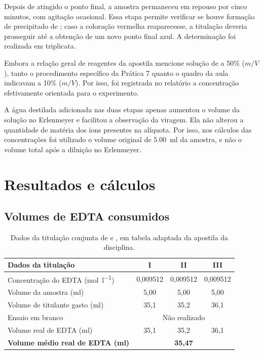 \documentclass[a4paper,12pt]{article}
\newcommand{\VolAmostra}{5.00}
\begin{document}
Depois de atingido o ponto final, a amostra permaneceu em repouso por cinco
minutos, com agitação ocasional. Essa etapa permite verificar se houve
formação de precipitado de ; caso a coloração vermelha
reaparecesse, a titulação deveria prosseguir até a obtenção de um novo ponto
final azul. A determinação foi realizada em triplicata.

Embora a relação geral de reagentes da apostila mencione solução de
 a 50\% ($m/V$), tanto o procedimento específico da Prática 7
quanto o quadro da aula indicavam  a 10\% ($m/V$). Por isso, foi
registrada no relatório a concentração efetivamente orientada para o
experimento.

A água destilada adicionada nas duas etapas apenas aumentou o volume da
solução no Erlenmeyer e facilitou a observação da viragem. Ela não alterou
a quantidade de matéria dos íons presentes na alíquota. Por isso, nos
cálculos das concentrações foi utilizado o volume original de
\qty{\VolAmostra}{\milli\litre} da amostra, e não o volume total após a
diluição no Erlenmeyer.

\section{Resultados e cálculos}

\subsection{Volumes de EDTA consumidos}

\begin{table}[H]
\centering
\caption{Dados da titulação conjunta de  e , em tabela
adaptada da apostila da disciplina.}
\label{tab:dados_total}
\begin{tabular}{lccc}
\toprule
\textbf{Dados da titulação} & \textbf{I} & \textbf{II} & \textbf{III}\\
\midrule
Concentração do EDTA (\si{\mole\per\litre})
  & 0,009512 & 0,009512 & 0,009512\\
Volume da amostra (\si{\milli\litre})
  & 5,00 & 5,00 & 5,00\\
Volume de titulante gasto (\si{\milli\litre})
  & 35,1 & 35,2 & 36,1\\
Ensaio em branco
  & \multicolumn{3}{c}{Não realizado}\\
Volume real de EDTA (\si{\milli\litre})
  & 35,1 & 35,2 & 36,1\\
\textbf{Volume médio real de EDTA (\si{\milli\litre})}
  & \multicolumn{3}{c}{\textbf{35,47}}\\
\bottomrule
\end{tabular}
\end{table}
\end{document}

